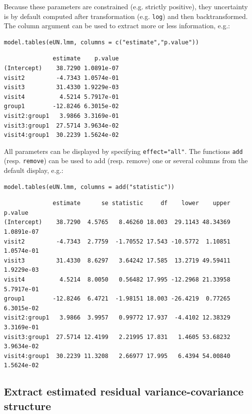 \documentclass[12pt]{article}
\begin{document}
Because these parameters are constrained (e.g. strictly positive),
they uncertainty is by default computed after transformation
(e.g. \texttt{log}) and then backtransformed. The column argument can be used
to extract more or less information, e.g.:
\lstset{language=r,label= ,caption= ,captionpos=b,numbers=none}
\begin{lstlisting}
model.tables(eUN.lmm, columns = c("estimate","p.value"))
\end{lstlisting}

\begin{verbatim}
              estimate    p.value
(Intercept)    38.7290 1.0891e-07
visit2         -4.7343 1.0574e-01
visit3         31.4330 1.9229e-03
visit4          4.5214 5.7917e-01
group1        -12.8246 6.3015e-02
visit2:group1   3.9866 3.3169e-01
visit3:group1  27.5714 3.9634e-02
visit4:group1  30.2239 1.5624e-02
\end{verbatim}


All parameters can be displayed by specifying
\texttt{effect="all"}.  The functions \texttt{add} (resp. \texttt{remove})
can be used to add (resp. remove) one or several columns from the
default display, e.g.:
\lstset{language=r,label= ,caption= ,captionpos=b,numbers=none}
\begin{lstlisting}
model.tables(eUN.lmm, columns = add("statistic"))
\end{lstlisting}

\begin{verbatim}
              estimate      se statistic     df    lower    upper    p.value
(Intercept)    38.7290  4.5765   8.46260 18.003  29.1143 48.34369 1.0891e-07
visit2         -4.7343  2.7759  -1.70552 17.543 -10.5772  1.10851 1.0574e-01
visit3         31.4330  8.6297   3.64242 17.585  13.2719 49.59411 1.9229e-03
visit4          4.5214  8.0050   0.56482 17.995 -12.2968 21.33958 5.7917e-01
group1        -12.8246  6.4721  -1.98151 18.003 -26.4219  0.77265 6.3015e-02
visit2:group1   3.9866  3.9957   0.99772 17.937  -4.4102 12.38329 3.3169e-01
visit3:group1  27.5714 12.4199   2.21995 17.831   1.4605 53.68232 3.9634e-02
visit4:group1  30.2239 11.3208   2.66977 17.995   6.4394 54.00840 1.5624e-02
\end{verbatim}

\subsection{Extract estimated residual variance-covariance structure}
\label{sec:org62af89d}
\end{document}
